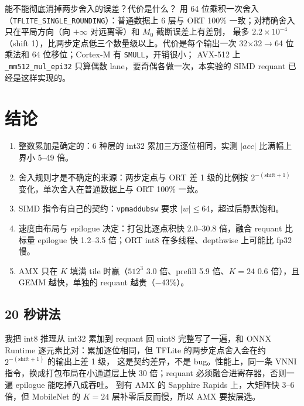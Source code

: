 \documentclass[11pt,a4paper]{ctexart}
\begin{document}
\begin{iqbox}{能不能彻底消掉两步舍入的误差？代价是什么？}
用 64 位乘积一次舍入（\texttt{TFLITE\_SINGLE\_ROUNDING}）：普通数据上 6 层与 ORT 100\% 一致；对精确舍入只在平局方向（向 $+\infty$ 对远离零）和 $M_0$ 截断误差上有差别，
最多 $2.2\times10^{-4}$（shift 1），比两步定点低三个数量级以上。代价是每个输出一次 32$\times$32$\to$64 位乘法和 64 位移位；Cortex-M 有 \texttt{SMULL}，开销很小；
AVX-512 上 \texttt{\_mm512\_mul\_epi32} 只算偶数 lane，要奇偶各做一次，本实验的 SIMD requant 已经是这样实现的。
\end{iqbox}

\section{结论}

\begin{findingbox}[：本实验的五条结论]
\begin{enumerate}
  \item 整数累加是确定的：6 种层的 int32 累加三方逐位相同，实测 $|acc|$ 比满幅上界小 5--49 倍。
  \item 舍入规则才是不确定的来源：两步定点与 ORT 差 1 级的比例按 $2^{-(\mathrm{shift}+1)}$ 变化，单次舍入在普通数据上与 ORT 100\% 一致。
  \item SIMD 指令有自己的契约：\texttt{vpmaddubsw} 要求 $|w|\le64$，超过后静默饱和。
  \item 速度由布局与 epilogue 决定：打包比逐点积快 2.0--30.8 倍，融合 requant 比标量 epilogue 快 1.2--3.5 倍；ORT int8 在多线程、depthwise 上可能比 fp32 慢。
  \item AMX 只在 $K$ 填满 tile 时赢（$512^3$ 3.0 倍、prefill 5.9 倍、$K=24$ 0.6 倍），且 GEMM 越快，单独的 requant 越贵（$-43\%$）。
\end{enumerate}
\end{findingbox}

\subsection*{20 秒讲法}

我把 int8 推理从 int32 累加到 requant 回 uint8 完整写了一遍，和 ONNX Runtime 逐元素比对：累加逐位相同，但 TFLite 的两步定点舍入会在约 $2^{-(\mathrm{shift}+1)}$ 的输出上差 1 级，
这是契约差异，不是 bug。性能上，同一条 VNNI 指令，换成打包布局在小通道层上快 30 倍；requant 必须融合进寄存器，否则一遍 epilogue 能吃掉八成吞吐。
到有 AMX 的 Sapphire Rapids 上，大矩阵快 3--6 倍，但 MobileNet 的 $K=24$ 层补零后反而慢，所以 AMX 要按层选。
\end{document}
